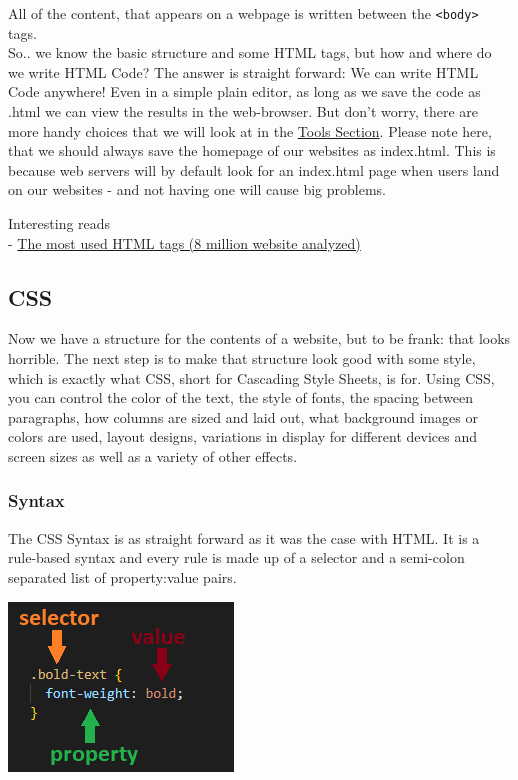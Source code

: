 \documentclass[
]{article}
\begin{document}
All of the content, that appears on a webpage is written between the \texttt{\textless{}body\textgreater{}} tags.\\
So.. we know the basic structure and some HTML tags, but how and where do we write HTML Code? The answer is straight forward: We can write HTML Code anywhere! Even in a simple plain editor, as long as we save the code as .html we can view the results in the web-browser. But don't worry, there are more handy choices that we will look at in the \protect\hyperlink{tools}{Tools Section}. Please note here, that we should always save the homepage of our websites as index.html. This is because web servers will by default look for an index.html page when users land on our websites - and not having one will cause big problems.

Interesting reads\\
- \href{https://css-tricks.com/average-web-page-data-analyzing-8-million-websites/}{The most used HTML tags (8 million website analyzed)}

\hypertarget{css}{%
\subsection{CSS}\label{css}}

Now we have a structure for the contents of a website, but to be frank: that looks horrible. The next step is to make that structure look good with some style, which is exactly what CSS, short for Cascading Style Sheets, is for. Using CSS, you can control the color of the text, the style of fonts, the spacing between paragraphs, how columns are sized and laid out, what background images or colors are used, layout designs, variations in display for different devices and screen sizes as well as a variety of other effects.

\hypertarget{syntax}{%
\subsubsection*{Syntax}\label{syntax}}

The CSS Syntax is as straight forward as it was the case with HTML. It is a rule-based syntax and every rule is made up of a selector and a semi-colon separated list of property:value pairs.

\includegraphics{docs/assets/css_example.png}
\end{document}
